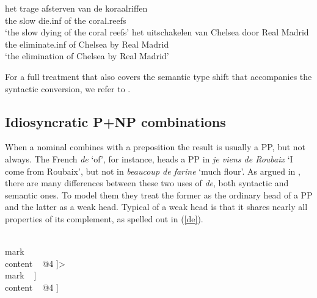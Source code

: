 \documentclass[output=paper]{langsci/langscibook}
\begin{document}
\begin{exe} 
\ex\label{van} 
\gll   het trage afsterven van de koraalriffen   \\
       the slow die.{\sc inf} of the coral.reefs \\
\trans `the slow dying of the coral reefs' 
\ex\label{door}
\gll   het uitschakelen van Chelsea door Real Madrid      \\
       the eliminate.{\sc inf} of Chelsea by Real Madrid  \\ 
\trans `the elimination of Chelsea by Real Madrid'  
\end{exe} 

For a full treatment that also covers the semantic type shift that 
accompanies the syntactic conversion, we refer to \citet{VanEynde19}.


\subsection{Idiosyncratic P+NP combinations} 


When a nominal combines with a preposition the result is usually a PP, but 
not always. The French \emph{de} `of', for instance, heads a PP in 
\emph{je viens de Roubaix} `I come from Roubaix', 
but not in \emph{beaucoup de farine} `much flour'. 
As argued in \citet{Abeilleetal04}, there are many differences 
between these two uses of \emph{de}, both syntactic and semantic ones.
To model them they treat the former as the ordinary head of a PP and 
the latter as a weak head. Typical of a weak head is that it shares 
nearly all properties of its complement, as spelled out in (\ref{de}).

\begin{exe} 
\ex\label{de} 
\begin{avm} 
[cat [head ~ @1                              \\
      subj ~ @A                              \\
      spr ~ @B                               \\
      comps ~ <[cat [head ~ @1               \\
                     subj ~ @A               \\
                     spr ~ @B                \\
                     comps ~ < ~ >]          \\
                     mark ~  \\
                content ~ @4 ]>              \\ 
      mark ~ ]                      \\
 content ~ @4 ] 
\end{avm}
\end{exe} 
\end{document}
